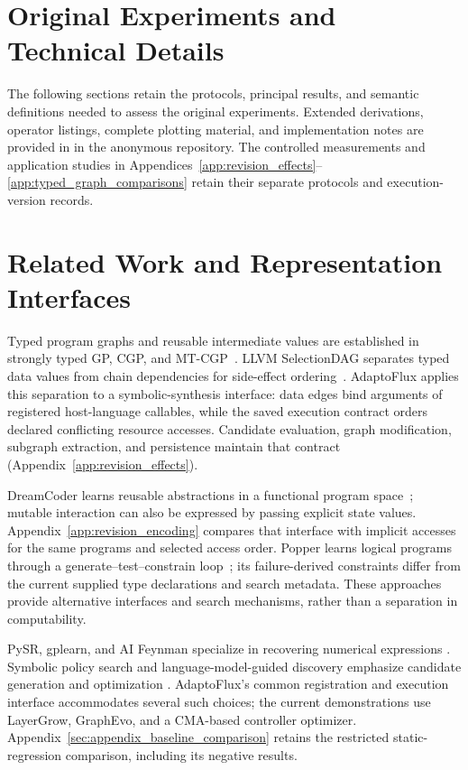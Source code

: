 \section*{Original Experiments and Technical Details}
The following sections retain the protocols, principal results, and semantic
definitions needed to assess the original experiments. Extended derivations,
operator listings, complete plotting material, and implementation notes are
provided in  in the anonymous repository.
The controlled measurements and application studies in
Appendices~\ref{app:revision_effects}--\ref{app:typed_graph_comparisons} retain their
separate protocols and execution-version records.

\section{Related Work and Representation Interfaces}
\label{sec:related_work}
Typed program graphs and reusable intermediate values are established in
strongly typed GP, CGP, and MT-CGP~\cite{montana1995strongly,miller2015cartesian,harding2012mtcgp}.
LLVM SelectionDAG separates typed data values from chain dependencies for
side-effect ordering~\cite{llvmSelectionDAG}. AdaptoFlux applies this separation
to a symbolic-synthesis interface: data edges bind arguments of registered
host-language callables, while the saved execution contract orders declared
conflicting resource accesses. Candidate evaluation, graph modification,
subgraph extraction, and persistence maintain that contract
(Appendix~\ref{app:revision_effects}).

DreamCoder learns reusable abstractions in a functional program
space~\cite{ellis2021dreamcoder}; mutable interaction can also be expressed by
passing explicit state values. Appendix~\ref{app:revision_encoding} compares
that interface with implicit accesses for the same programs and selected
access order. Popper learns logical programs through a
generate--test--constrain loop~\cite{cropper2021learning}; its failure-derived
constraints differ from the current supplied type declarations and search
metadata. These approaches provide alternative interfaces and search mechanisms,
rather than a separation in computability.

PySR, gplearn, and AI Feynman specialize in recovering numerical expressions
\cite{cranmer2023interpretable,udrescu2020ai}. Symbolic policy search and
language-model-guided discovery emphasize candidate generation and optimization
\cite{landajuela2021discovering,romera2024mathematical}. AdaptoFlux's common
registration and execution interface accommodates several such choices; the
current demonstrations use LayerGrow, GraphEvo, and a CMA-based controller
optimizer. Appendix~\ref{sec:appendix_baseline_comparison} retains the restricted
static-regression comparison, including its negative results.

